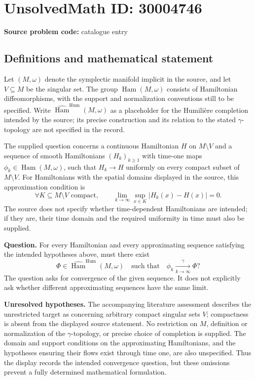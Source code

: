 \documentclass[11pt]{article}
\begin{document}
\section*{UnsolvedMath ID: 30004746}
\textbf{Source problem code:} catalogue entry
\subsection{Definitions and mathematical statement}
Let \((M,\omega)\) denote the symplectic manifold implicit in the source, and let \(V\subseteq M\) be the singular set. The group \(\operatorname{Ham}(M,\omega)\) consists of Hamiltonian diffeomorphisms, with the support and normalization conventions still to be specified. Write \(\widehat{\operatorname{Ham}}^{\mathrm{Hum}}(M,\omega)\) as a placeholder for the Humili\`ere completion intended by the source; its precise construction and its relation to the stated \(\gamma\)-topology are not specified in the record.

The supplied question concerns a continuous Hamiltonian \(H\) on \(M\setminus V\) and a sequence of smooth Hamiltonians \((H_k)_{k\geq 1}\) with time-one maps \(\phi_k\in\operatorname{Ham}(M,\omega)\), such that \(H_k\to H\) uniformly on every compact subset of \(M\setminus V\). For Hamiltonians with the spatial domains displayed in the source, this approximation condition is
\[
\forall K\subseteq M\setminus V\text{ compact},\qquad
\lim_{k\to\infty}\sup_{x\in K}|H_k(x)-H(x)|=0.
\]
The source does not specify whether time-dependent Hamiltonians are intended; if they are, their time domain and the required uniformity in time must also be supplied.

\textbf{Question.} For every Hamiltonian and every approximating sequence satisfying the intended hypotheses above, must there exist
\[
\Phi\in\widehat{\operatorname{Ham}}^{\mathrm{Hum}}(M,\omega)
\quad\text{such that}\quad
\phi_k\xrightarrow[k\to\infty]{\gamma}\Phi?
\]
The question asks for convergence of the given sequence. It does not explicitly ask whether different approximating sequences have the same limit.

\textbf{Unresolved hypotheses.} The accompanying literature assessment describes the unrestricted target as concerning arbitrary compact singular sets \(V\); compactness is absent from the displayed source statement. No restriction on \(M\), definition or normalization of the \(\gamma\)-topology, or precise choice of completion is supplied. The domain and support conditions on the approximating Hamiltonians, and the hypotheses ensuring their flows exist through time one, are also unspecified. Thus the display records the intended convergence question, but these omissions prevent a fully determined mathematical formulation.
\end{document}
